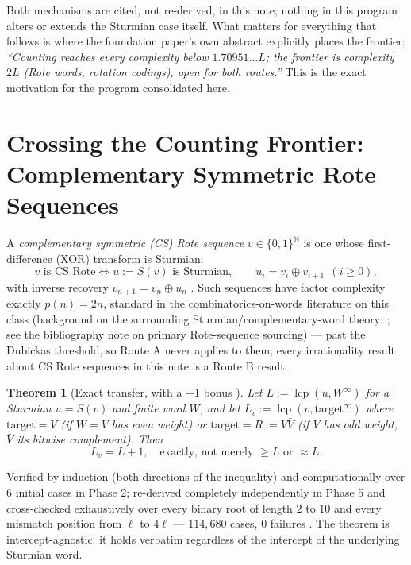 \documentclass[11pt]{article}
\newtheorem{theorem}{Theorem}[section]
\newcommand{\N}{\mathbb{N}}
\begin{document}
Both mechanisms are cited, not re-derived, in this note; nothing in this program alters or extends the Sturmian case itself. What matters for everything that follows is where the foundation paper's own abstract explicitly places the frontier: \emph{``Counting reaches every complexity below $1.70951\ldots L$; the frontier is complexity $2L$ (Rote words, rotation codings), open for both routes.''} This is the exact motivation for the program consolidated here.

\section{Crossing the Counting Frontier: Complementary Symmetric Rote Sequences}
\label{sec:rote}

A \emph{complementary symmetric (CS) Rote sequence} $v\in\{0,1\}^\N$ is one whose first-difference (XOR) transform is Sturmian:
\[
v \text{ is CS Rote} \iff u:=S(v) \text{ is Sturmian}, \qquad u_i = v_i\oplus v_{i+1}\ \ (i\ge0),
\]
with inverse recovery $v_{n+1}=v_n\oplus u_n$ \cite{Phase2Transfer}. Such sequences have factor complexity exactly $p(n)=2n$, standard in the combinatorics-on-words literature on this class (background on the surrounding Sturmian/complementary-word theory: \cite{Lothaire2002}; see the bibliography note on primary Rote-sequence sourcing) --- past the Dubickas threshold, so Route A never applies to them; every irrationality result about CS Rote sequences in this note is a Route B result.

\begin{theorem}[Exact transfer, with a $+1$ bonus \cite{Phase2Transfer}]
\label{thm:transfer}
Let $L:=\operatorname{lcp}(u,W^\infty)$ for a Sturmian $u=S(v)$ and finite word $W$, and let $L_v:=\operatorname{lcp}(v,\mathrm{target}^\infty)$ where $\mathrm{target}=V$ (if $W=V$ has even weight) or $\mathrm{target}=R:=V\bar V$ (if $V$ has odd weight, $\bar V$ its bitwise complement). Then
\[
L_v = L+1, \quad\text{exactly, not merely } \ge L \text{ or } \approx L.
\]
\end{theorem}
Verified by induction (both directions of the inequality) and computationally over $6$ initial cases in Phase 2; re-derived completely independently in Phase 5 and cross-checked exhaustively over every binary root of length $2$ to $10$ and every mismatch position from $\ell$ to $4\ell$ --- $114{,}680$ cases, $0$ failures \cite{Phase5Transfer}. The theorem is intercept-agnostic: it holds verbatim regardless of the intercept of the underlying Sturmian word.
\end{document}

